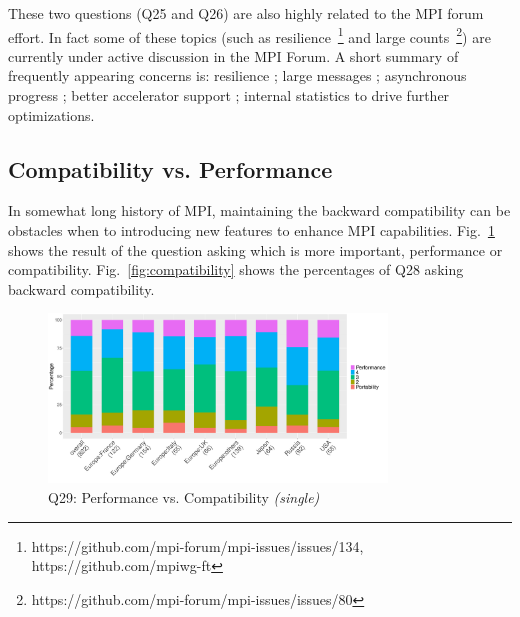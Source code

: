 \documentclass[conference,10pt,letterpaper]{IEEEtran}
\begin{document}
{%

These two questions (Q25 and Q26) are also highly related to the MPI forum effort. 
In fact some of these topics (such as
resilience~\footnote{https://github.com/mpi-forum/mpi-issues/issues/134,
https://github.com/mpiwg-ft} and large
counts~\footnote{https://github.com/mpi-forum/mpi-issues/issues/80}) are
currently under active discussion in the MPI Forum.
%
A short summary of frequently appearing concerns is: resilience ;
large messages ; asynchronous progress ; better accelerator support ;
internal statistics to drive further optimizations.
}
  
\subsection{Compatibility vs. Performance}

In somewhat long history of MPI, maintaining the backward
compatibility can be obstacles when to introducing new features to
enhance MPI capabilities. Fig.~\ref{fig:performance-vs-compatibility} shows the 
result of the question asking which is more important, performance or 
compatibility. Fig.~\ref{fig:compatibility} shows the percentages of
Q28 asking backward compatibility.

\begin{figure}[htb]
\begin{center}
\includegraphics[width=9cm]{R-scripts/Q29.pdf}
\caption{Q29: Performance vs. Compatibility {\it(single)}}
\label{fig:performance-vs-compatibility}
\end{center}
\end{figure}
\end{document}
